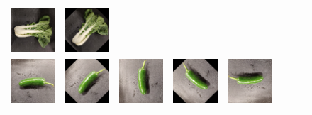 \begin{figure}[tp]
\begin{center}
\begin{tabular}{c|ccccccc}
			\includegraphics[scale=0.4]{./img/bokchoi_6.png} &
			\includegraphics[scale=0.4]{./img/bokchoi_7.png} \\
			\includegraphics[scale=0.4]{./img/jalapeno_0.png} &
			\includegraphics[scale=0.4]{./img/jalapeno_1.png} &
			\includegraphics[scale=0.4]{./img/jalapeno_2.png} &
			\includegraphics[scale=0.4]{./img/jalapeno_3.png} &
			\includegraphics[scale=0.4]{./img/jalapeno_4.png} &

\end{tabular}
\end{center}
\end{figure}
